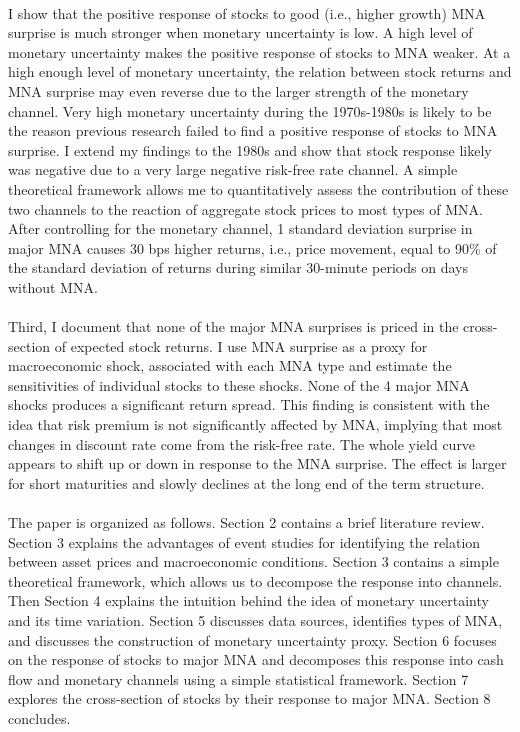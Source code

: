 \documentclass[12pt]{article}
\begin{document}
\paragraph{}
I show that the positive response of stocks to good (i.e., higher growth) MNA surprise is much stronger when monetary uncertainty is low. A high level of monetary uncertainty makes the positive response of stocks to MNA weaker. At a high enough level of monetary uncertainty, the relation between stock returns and MNA surprise may even reverse due to the larger strength of the monetary channel. Very high monetary uncertainty during the 1970s-1980s is likely to be the reason previous research failed to find a positive response of stocks to MNA surprise. I extend my findings to the 1980s and show that stock response likely was negative due to a very large negative risk-free rate channel. A simple theoretical framework allows me to quantitatively assess the contribution of these two channels to the reaction of aggregate stock prices to most types of MNA. After controlling for the monetary channel, 1 standard deviation surprise in major MNA causes 30 bps higher returns, i.e., price movement, equal to 90\% of the standard deviation of returns during similar 30-minute periods on days without MNA. 
\paragraph{}
Third, I document that none of the major MNA surprises is priced in the cross-section of expected stock returns. I use MNA surprise as a proxy for macroeconomic shock, associated with each MNA type and estimate the sensitivities of individual stocks to these shocks. None of the 4 major MNA shocks produces a significant return spread. This finding is consistent with the idea that risk premium is not significantly affected by MNA, implying that most changes in discount rate come from the risk-free rate. The whole yield curve appears to shift up or down in response to the MNA surprise. The effect is larger for short maturities and slowly declines at the long end of the term structure.
\paragraph{}
The paper is organized as follows. Section 2 contains a brief literature review. Section 3 explains the advantages of event studies for identifying the relation between asset prices and macroeconomic conditions. Section 3 contains a simple theoretical framework, which allows us to decompose the response into channels. Then Section 4 explains the intuition behind the idea of monetary uncertainty and its time variation. Section 5 discusses data sources, identifies types of MNA, and discusses the construction of monetary uncertainty proxy. Section 6 focuses on the response of stocks to major MNA and decomposes this response into cash flow and monetary channels using a simple statistical framework. Section 7 explores the cross-section of stocks by their response to major MNA. Section 8 concludes.
\end{document}

